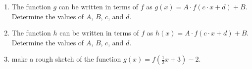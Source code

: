\begin{enumerate}
\begin{tikzpicture}[y=1.0cm, x=1.0cm,font=\sffamily]
  \end{tikzpicture}


  \begin{enumerate}
  \item The function $g$ can be written in terms of $f$
    as $g(x)=A\cdot f(c\cdot x +d)+B$. Determine the values of $A$, $B$,
    $c$, and $d$.
    
  \item The function $h$ can be written in terms of $f$
    as $h(x)=A\cdot f(c\cdot x +d)+B$. Determine the values of $A$, $B$,
    $c$, and $d$.

  \item make a rough sketch of the function
    $g(x)=f\left(\frac{1}{2}x+3\right)-2$.

  \end{enumerate}


\end{enumerate}
